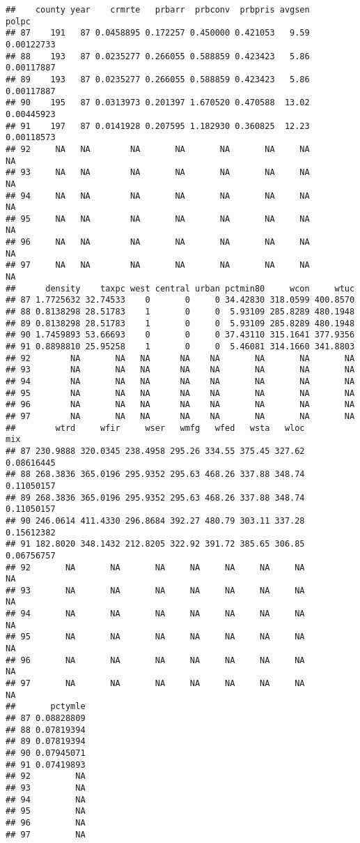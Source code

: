 \documentclass[]{article}
\begin{document}
\begin{verbatim}
##    county year    crmrte   prbarr  prbconv  prbpris avgsen      polpc
## 87    191   87 0.0458895 0.172257 0.450000 0.421053   9.59 0.00122733
## 88    193   87 0.0235277 0.266055 0.588859 0.423423   5.86 0.00117887
## 89    193   87 0.0235277 0.266055 0.588859 0.423423   5.86 0.00117887
## 90    195   87 0.0313973 0.201397 1.670520 0.470588  13.02 0.00445923
## 91    197   87 0.0141928 0.207595 1.182930 0.360825  12.23 0.00118573
## 92     NA   NA        NA       NA       NA       NA     NA         NA
## 93     NA   NA        NA       NA       NA       NA     NA         NA
## 94     NA   NA        NA       NA       NA       NA     NA         NA
## 95     NA   NA        NA       NA       NA       NA     NA         NA
## 96     NA   NA        NA       NA       NA       NA     NA         NA
## 97     NA   NA        NA       NA       NA       NA     NA         NA
##      density    taxpc west central urban pctmin80     wcon     wtuc
## 87 1.7725632 32.74533    0       0     0 34.42830 318.0599 400.8570
## 88 0.8138298 28.51783    1       0     0  5.93109 285.8289 480.1948
## 89 0.8138298 28.51783    1       0     0  5.93109 285.8289 480.1948
## 90 1.7459893 53.66693    0       0     0 37.43110 315.1641 377.9356
## 91 0.8898810 25.95258    1       0     0  5.46081 314.1660 341.8803
## 92        NA       NA   NA      NA    NA       NA       NA       NA
## 93        NA       NA   NA      NA    NA       NA       NA       NA
## 94        NA       NA   NA      NA    NA       NA       NA       NA
## 95        NA       NA   NA      NA    NA       NA       NA       NA
## 96        NA       NA   NA      NA    NA       NA       NA       NA
## 97        NA       NA   NA      NA    NA       NA       NA       NA
##        wtrd     wfir     wser   wmfg   wfed   wsta   wloc        mix
## 87 230.9888 320.0345 238.4958 295.26 334.55 375.45 327.62 0.08616445
## 88 268.3836 365.0196 295.9352 295.63 468.26 337.88 348.74 0.11050157
## 89 268.3836 365.0196 295.9352 295.63 468.26 337.88 348.74 0.11050157
## 90 246.0614 411.4330 296.8684 392.27 480.79 303.11 337.28 0.15612382
## 91 182.8020 348.1432 212.8205 322.92 391.72 385.65 306.85 0.06756757
## 92       NA       NA       NA     NA     NA     NA     NA         NA
## 93       NA       NA       NA     NA     NA     NA     NA         NA
## 94       NA       NA       NA     NA     NA     NA     NA         NA
## 95       NA       NA       NA     NA     NA     NA     NA         NA
## 96       NA       NA       NA     NA     NA     NA     NA         NA
## 97       NA       NA       NA     NA     NA     NA     NA         NA
##       pctymle
## 87 0.08828809
## 88 0.07819394
## 89 0.07819394
## 90 0.07945071
## 91 0.07419893
## 92         NA
## 93         NA
## 94         NA
## 95         NA
## 96         NA
## 97         NA
\end{verbatim}
\end{document}
